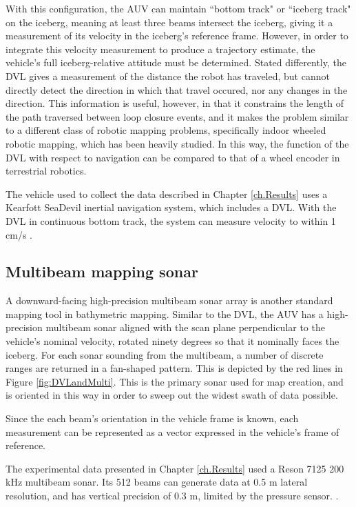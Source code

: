 With this configuration, the AUV can maintain ``bottom track" or ``iceberg track" on the iceberg, meaning at least three beams intersect the iceberg, giving it a measurement of its velocity in the iceberg's reference frame. However, in order to integrate this velocity measurement to produce a trajectory estimate, the vehicle's full iceberg-relative attitude must be determined. Stated differently, the DVL gives a measurement of the distance the robot has traveled, but cannot directly detect the direction in which that travel occured, nor any changes in the direction. This information is useful, however, in that it constrains the length of the path traversed between loop closure events, and it makes the problem similar to a different class of robotic mapping problems, specifically indoor wheeled robotic mapping, which has been heavily studied. In this way, the function of the DVL with respect to navigation can be compared to that of a wheel encoder in terrestrial robotics.

The vehicle used to collect the data described in Chapter \ref{ch.Results} uses a Kearfott SeaDevil inertial navigation system, which includes a DVL. With the DVL in continuous bottom track, the system can measure velocity to within 1 cm/s \cite{McEwen2005}.

\subsection{Multibeam mapping sonar}

A downward-facing high-precision multibeam sonar array is another standard mapping tool in bathymetric mapping. Similar to the DVL, the AUV has a high-precision multibeam sonar aligned with the scan plane perpendicular to the vehicle's nominal velocity, rotated ninety degrees so that it nominally faces the iceberg. For each sonar sounding from the multibeam, a number of discrete ranges are returned in a fan-shaped pattern. This is depicted by the red lines in Figure \ref{fig:DVLandMulti}. This is the primary sonar used for map creation, and is oriented in this way in order to sweep out the widest swath of data possible. 

Since the each beam's orientation in the vehicle frame is known, each measurement can be represented as a vector expressed in the vehicle's frame of reference.

The experimental data presented in Chapter \ref{ch.Results} used a Reson 7125 200 kHz multibeam sonar. Its 512 beams can generate data at 0.5 m lateral resolution, and has vertical precision of 0.3 m, limited by the pressure sensor. \cite{MappingAUV}.

